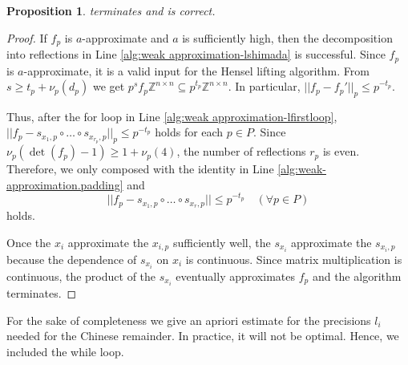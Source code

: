 \documentclass[11pt,letterpaper]{amsart}
\newcommand{\ZZ}{\mathbb{Z}}
\newtheorem{proposition}[theorem]{Proposition}
\theoremstyle{definition}
\theoremstyle{remark}
\begin{document}
\begin{proposition}
 terminates and is correct. 
\end{proposition}
\begin{proof}
If $f_p$ is $a$-approximate and $a$ is sufficiently high, then the decomposition into reflections in Line \ref{alg:weak approximation-lshimada} is successful. 
Since $f_p$ is $a$-approximate, it is a valid input for the Hensel lifting algorithm.
From $s \geq t_p + \nu_p(d_p)$ we get $p^sf_p \ZZ^{n \times n} \subseteq p^{t_p}\ZZ^{n\times n}$. In particular, $||f_p-f_p'||_p \leq p^{-t_p}$.   

Thus, after the for loop in Line \ref{alg:weak approximation-lfirstloop}, $||f_p - s_{x_1,p} \circ \dots \circ s_{x_{r_p},p}||_p\leq p^{-t_p}$ holds for each $p \in P$.  
Since $\nu_p(\det(f_p)-1)\geq 1 + \nu_p(4)$, the number of reflections $r_p$ is even. Therefore, we only composed with the identity in Line \ref{alg:weak-approximation.padding} and 
\[||f_p - s_{x_1,p} \circ \dots \circ s_{x_{r},p}||\leq p^{-t_p} \quad (\forall p \in P)\]
holds. 

Once the $x_i$ approximate the $x_{i,p}$ sufficiently well, the $s_{x_i}$ approximate the $s_{x_i,p}$ because the dependence of $s_{x_i}$ on $x_i$ is continuous. Since matrix multiplication is continuous, the product of the $s_{x_i}$ eventually approximates $f_p$ and the algorithm terminates. 
\end{proof}

For the sake of completeness we give an apriori estimate for the precisions $l_i$ needed for the Chinese remainder. In practice, it will not be optimal. Hence, we included the while loop.
\end{document}
